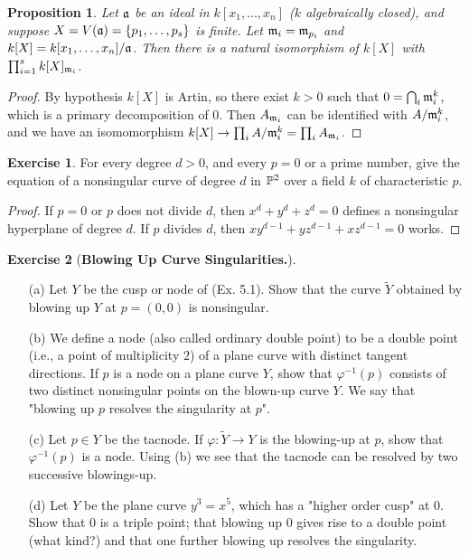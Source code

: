 \documentclass[11pt]{book}
\newtheorem{proposition}[theorem]{Proposition}
\theoremstyle{definition}
\newtheorem{exercise}{Exercise}[section]
\begin{document}
\begin{proposition}\label{polynomial ring Artin char}
Let $\a$ be an ideal in $k[x_1,\dots,x_n]$ ($k$ algebraically closed), and suppose $X=V(\a)=\{p_1,\dots,p_s\}$ is finite. Let $\m_i=\m_{p_i}$ and $k[X]=k[x_1,\dots,x_n]/\a$. Then there is a natural isomorphism of $k[X]$ with $\prod_{i=1}^{s}k[X]_{\m_i}$.
\end{proposition}
\begin{proof}
By hypothesis $k[X]$ is Artin, so there exist $k>0$ such that $0=\bigcap_i\m_i^k$, which is a primary decomposition of $0$. Then $A_{\m_i}$ can be identified with $A/\m_i^k$, and we have an isomomorphism $k[X]\to\prod_iA/\m_i^k=\prod_iA_{\m_i}$.
\end{proof}
\begin{exercise}
For every degree $d>0$, and every $p=0$ or a prime number, give the equation of a nonsingular curve of degree $d$ in $\P^2$ over a field $k$ of characteristic $p$.
\end{exercise}
\begin{proof}
If $p=0$ or $p$ does not divide $d$, then $x^d+y^d+z^d=0$ defines a nonsingular hyperplane of degree $d$. If $p$ divides $d$, then $xy^{d-1}+yz^{d-1}+xz^{d-1}=0$ works.
\end{proof}
\begin{exercise}[\textbf{Blowing Up Curve Singularities.}]
\mbox{}
\begin{itemize}
\item[(a)] Let $Y$ be the cusp or node of (Ex. 5.1). Show that the curve $\tilde{Y}$ obtained by blowing up $Y$ at $p=(0,0)$ is nonsingular.
\item[(b)] We define a node (also called ordinary double point) to be a double point (i.e., a point of multiplicity $2$) of a plane curve with distinct tangent directions. If $p$ is a node on a plane curve $Y$, show that $\varphi^{-1}(p)$ consists of two distinct nonsingular points on the blown-up curve $Y$. We say that "blowing up $p$ resolves the singularity at $p$".
\item[(c)] Let $p\in Y$ be the tacnode. If $\varphi:\tilde{Y}\to Y$ is the blowing-up at $p$, show that $\varphi^{-1}(p)$ is a node. Using (b) we see that the tacnode can be resolved by two successive blowings-up.
\item[(d)] Let $Y$ be the plane curve $y^3=x^5$, which has a "higher order cusp" at $0$. Show that $0$ is a triple point; that blowing up $0$ gives rise to a double point (what kind?) and that one further blowing up resolves the singularity.
\end{itemize}
\end{exercise}
\end{document}
